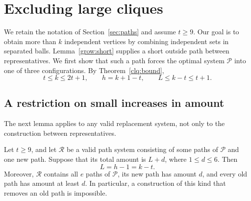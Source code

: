 \section{Excluding large cliques}\label{sec:terminal}

We retain the notation of Section~\ref{sec:paths} and assume \(t\ge9\).
Our goal is to obtain more than \(k\) independent vertices by combining
independent sets in separated balls.  Lemma~\ref{grow:short} supplies a short
outside path between representatives.  We first show that such a path forces
the optimal system \(\mathcal P\) into one of three configurations.
By Theorem~\ref{clq:bound},
\[
 t\le k\le2t+1,\qquad h=k+1-t,\qquad L\le k-t\le t+1.
\]

\subsection{A restriction on small increases in amount}

The next lemma applies to any valid replacement system, not only to the
construction between representatives.

\begin{lemma}\label{terminal:increment}
Let \(t\ge9\), and let \(\mathcal R\) be a valid path system consisting of some
paths of \(\mathcal P\) and one new path.  Suppose that its total amount is
\(L+d\), where \(1\le d\le6\).  Then
\[
 L=h-1=k-t.
\]
Moreover, \(\mathcal R\) contains all \(e\) paths of \(\mathcal P\), its new
path has amount \(d\), and every old path has amount at least \(d\).
In particular, a construction of this kind that removes an old path is
impossible.
\end{lemma}


